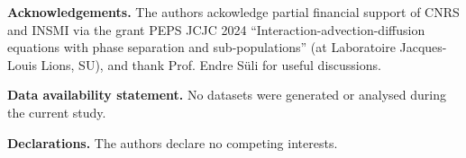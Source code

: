 \documentclass[11pt,a4paper,reqno]{amsart}
\theoremstyle{remark}
\theoremstyle{definition}
\numberwithin{equation}{section}
\begin{document}
\begin{small}
\noindent\textbf{Acknowledgements.} The authors ackowledge partial financial support of CNRS and INSMI via the grant PEPS JCJC 2024 ``Interaction-advection-diffusion equations with phase separation and sub-populations''  (at Laboratoire Jacques-Louis Lions, SU), and thank Prof. Endre S\"uli for useful discussions. 

\noindent\textbf{Data availability statement.} No datasets were generated or analysed during the current study.

\noindent\textbf{Declarations.} The authors declare no competing 
 interests.
\end{small}
\end{document}
